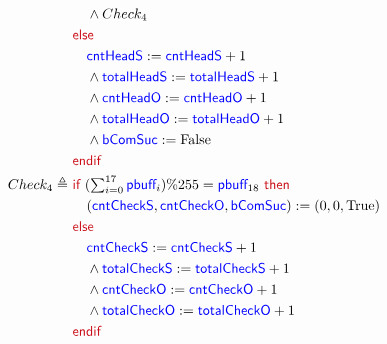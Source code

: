 \documentclass[fleqn,a4paper]{article}
\newcommand\Var[1]{\textcolor{blue}{\textsf{#1}}}
\newcommand\syntax[1]{\textcolor[RGB]{202,12,22}{\textsf{#1}}}
\newcommand\definedby{\triangleq}
\begin{document}
\begin{description}
\begin{align*}
& \quad \wedge Check_4 \\
& \syntax{else} \\
& \quad \Var{cntHeadS} := \Var{cntHeadS} + 1 \\
& \quad \wedge \Var{totalHeadS} := \Var{totalHeadS} + 1 \\
& \quad \wedge \Var{cntHeadO} := \Var{cntHeadO} + 1 \\
& \quad \wedge \Var{totalHeadO} := \Var{totalHeadO} + 1 \\
& \quad \wedge \Var{bComSuc} := \text{False} \\
& \syntax{endif} \\
Check_4 \definedby \
& \syntax{if } (\textstyle \sum_{i=0}^{17} \Var{pbuff}_i) \% 255 = \Var{pbuff}_{18} \syntax{ then} \\
& \quad (\Var{cntCheckS}, \Var{cntCheckO}, \Var{bComSuc}) := (0, 0, \text{True}) \\
& \syntax{else} \\
& \quad \Var{cntCheckS} := \Var{cntCheckS} + 1 \\
& \quad \wedge \Var{totalCheckS} := \Var{totalCheckS} + 1 \\
& \quad \wedge \Var{cntCheckO} := \Var{cntCheckO} + 1 \\
& \quad \wedge \Var{totalCheckO} := \Var{totalCheckO} + 1 \\
& \syntax{endif}
\end{align*}

\end{description}
\end{document}
